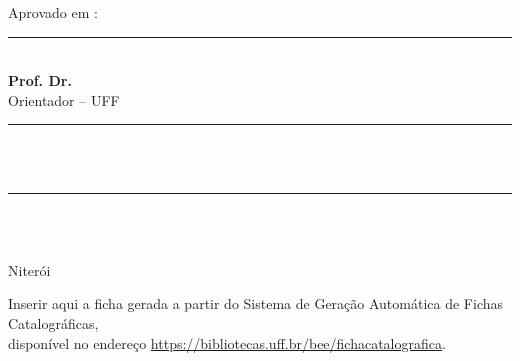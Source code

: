 \vspace{1.6cm}
\hspace*{1.25cm}Aprovado em :

\vspace{1.2cm}
\begin{singlespace}
\begin{center}
  \rule{9cm}{0.4pt}\\
  \textbf{Prof. Dr. \orientador}\\
  Orientador -- UFF

  \vspace{1.3cm}
  \rule{9cm}{0.4pt}\\
  \textbf{}\\

  \vspace{1.3cm}
  \rule{9cm}{0.4pt}\\
  \textbf{}\\
\end{center}
\end{singlespace}

\vfill
\begin{center}
  {\large Niterói\\ \anoentrega}
\end{center}
\clearpage

\thispagestyle{empty}
\vspace*{\fill}
\begin{center}
  \begin{singlespace}
    \small
    Inserir aqui a ficha gerada a partir do Sistema de Geração Automática de Fichas Catalográficas,\\
    disponível no endereço \url{https://bibliotecas.uff.br/bee/fichacatalografica}.\\[0.3cm]
  \end{singlespace}
\end{center}
\clearpage

\pagestyle{plain}
